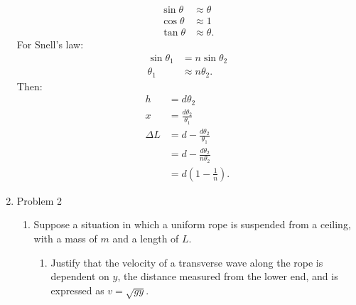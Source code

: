 \documentclass{article}
\begin{document}
\begin{enumerate}
    \begin{align}
      \sin\theta &\approx \theta \\
      \cos\theta &\approx 1 \\
      \tan\theta &\approx \theta
    .\end{align}
    For Snell's law:
    \begin{align}
      \sin\theta_1&=n\sin\theta_2 \\
      \theta_1 &\approx n\theta_2
    .\end{align}
    Then:
    \begin{align}
      h   & = d\theta_2 \\
      x   & = \frac{d\theta_2}{\theta_1} \\
      \Delta L &= d-\frac{d\theta_2}{\theta_1} \\
          & = d-\frac{d\theta_2}{n\theta_2} \\
          & = d\left( 1-\frac{1}{n} \right)
    .\end{align}

  \item Problem 2
    \begin{enumerate}
      \item Suppose a situation in which a uniform rope is suspended from a
        ceiling, with a mass of $m$ and a length of $L$.
        \begin{enumerate}
          \item Justify that the velocity of a transverse wave along the rope
            is dependent on $y$, the distance measured from the lower end, and is
            expressed as $v = \sqrt{gy}$.


\end{enumerate}
\end{enumerate}
\end{enumerate}
\end{document}
